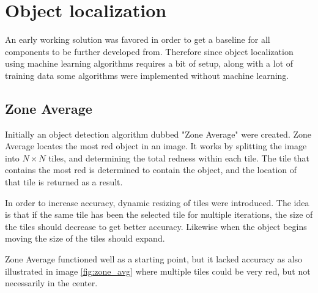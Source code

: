\section{Object localization}\label{Design:ObjectLocalization}
An early working solution was favored in order to get a baseline for all components to be further developed from.
Therefore since object localization using machine learning algorithms requires a bit of setup, along with a lot of training data some algorithms were implemented without machine learning.

\subsection{Zone Average}
Initially an object detection algorithm dubbed "Zone Average" were created.
Zone Average locates the most red object in an image.
It works by splitting the image into $N\times N$ tiles, and determining the total redness within each tile.
The tile that contains the most red is determined to contain the object, and the location of that tile is returned as a result.

In order to increase accuracy, dynamic resizing of tiles were introduced.
The idea is that if the same tile has been the selected tile for multiple iterations, the size of the tiles should decrease to get better accuracy.
Likewise when the object begins moving the size of the tiles should expand.


Zone Average functioned well as a starting point, but it lacked accuracy as also illustrated in image \ref{fig:zone_avg} where multiple tiles could be very red, but not necessarily in the center.

